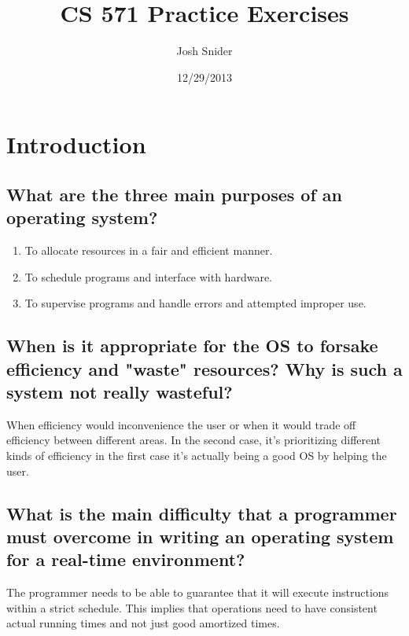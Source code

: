 \documentclass{book}%
\title{CS 571 Practice Exercises}
\author{Josh Snider}
\date{12/29/2013}
\begin{document}
\maketitle
\setcounter{tocdepth}{0}
\tableofcontents
\chapter{Introduction}
\section{What are the three main purposes of an operating system?}
\begin{enumerate}
\item To allocate resources in a fair and efficient manner.
\item To schedule programs and interface with hardware.
\item To supervise programs and handle errors and attempted improper use.
\end{enumerate}
\section{When is it appropriate for the OS to forsake efficiency and "waste"
 resources? Why is such a system not really wasteful?}
When efficiency would inconvenience the user or when it would trade off
efficiency between different areas. In the second case, it's prioritizing 
different kinds of efficiency in the first case it's actually being a good OS 
by helping the user.
\section{What is the main difficulty that a programmer must overcome in
writing an operating system for a real-time environment?}
The programmer needs to be able to guarantee that it will execute instructions
within a strict schedule. This implies that operations need to have consistent
actual running times and not just good amortized times.
\end{document}
